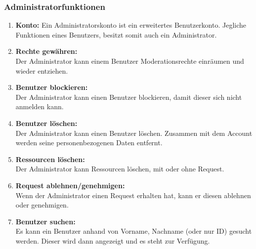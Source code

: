 \documentclass[parskip=full,11pt]{scrartcl}
\def\threedigits#1{%
  \ifnum#1<10 0\fi
  \ifnum#1<1 0\fi
  \number#1}
\begin{document}
\subsubsection{Administratorfunktionen}
\begin{enumerate}[label={\textbf{/F\protect\threedigits{\theenumi}0/}}, leftmargin=*, resume]
\item \textbf{Konto:} Ein Administratorskonto ist ein erweitertes Benutzerkonto. Jegliche Funktionen eines Benutzers, besitzt somit auch ein Administrator.
\item \textbf{Rechte gewähren:}\\  Der Administrator kann einem Benutzer Moderationsrechte einräumen und wieder entziehen.
\item \textbf{Benutzer blockieren:}\\ Der Administrator kann einen Benutzer blockieren, damit dieser sich nicht anmelden kann.
\item \textbf{Benutzer löschen:}\\ Der Administrator kann einen Benutzer löschen. Zusammen mit dem Account werden seine personenbezogenen Daten entfernt.
\item \textbf{Ressourcen löschen:}\\ Der Administrator kann Ressourcen löschen, mit oder ohne Request.
\item \textbf{Request ablehnen/genehmigen:}\\ Wenn der Administrator einen Request erhalten hat, kann er diesen ablehnen oder genehmigen.
\item \textbf{Benutzer suchen:}\\ Es kann ein Benutzer anhand von Vorname, Nachname (oder nur ID) gesucht werden. Dieser wird dann angezeigt und es steht zur Verfügung.


\end{enumerate}
\end{document}
